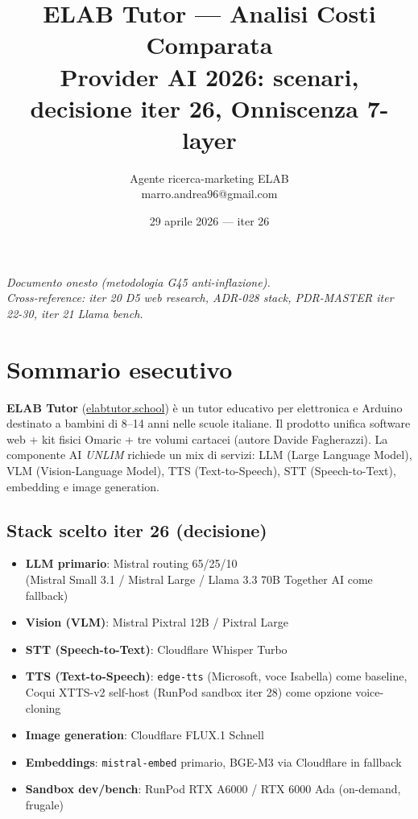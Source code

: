 \documentclass[12pt,a4paper]{article}
\title{\color{elabnavy}\textbf{ELAB Tutor --- Analisi Costi Comparata}\\
\large Provider AI 2026: scenari, decisione iter 26, Onniscenza 7-layer}
\author{Agente ricerca-marketing ELAB \\ marro.andrea96@gmail.com}
\date{29 aprile 2026 --- iter 26}
\begin{document}
\maketitle
\thispagestyle{empty}

\begin{center}
\color{elabgray}\textit{Documento onesto (metodologia G45 anti-inflazione). \\
Cross-reference: iter 20 D5 web research, ADR-028 stack, PDR-MASTER iter 22-30, iter 21 Llama bench.}
\end{center}

\vspace{0.5cm}

\tableofcontents
\newpage

\section{Sommario esecutivo}

\textbf{ELAB Tutor} (\href{https://www.elabtutor.school}{elabtutor.school}) è un tutor educativo per
elettronica e Arduino destinato a bambini di 8--14 anni nelle scuole italiane.
Il prodotto unifica software web + kit fisici Omaric + tre volumi cartacei (autore Davide Fagherazzi).
La componente AI \emph{UNLIM} richiede un mix di servizi: LLM (Large Language Model),
VLM (Vision-Language Model), TTS (Text-to-Speech), STT (Speech-to-Text), embedding e image generation.

\subsection*{Stack scelto iter 26 (decisione)}

\begin{itemize}[leftmargin=*]
  \item \textbf{LLM primario}: Mistral routing 65/25/10 \\
  (Mistral Small 3.1 / Mistral Large / Llama 3.3 70B Together AI come fallback)
  \item \textbf{Vision (VLM)}: Mistral Pixtral 12B / Pixtral Large
  \item \textbf{STT (Speech-to-Text)}: Cloudflare Whisper Turbo
  \item \textbf{TTS (Text-to-Speech)}: \texttt{edge-tts} (Microsoft, voce Isabella) come baseline,
        Coqui XTTS-v2 self-host (RunPod sandbox iter 28) come opzione voice-cloning
  \item \textbf{Image generation}: Cloudflare FLUX.1 Schnell
  \item \textbf{Embeddings}: \texttt{mistral-embed} primario, BGE-M3 via Cloudflare in fallback
  \item \textbf{Sandbox dev/bench}: RunPod RTX A6000 / RTX 6000 Ada (on-demand, frugale)
\end{itemize}
\end{document}
